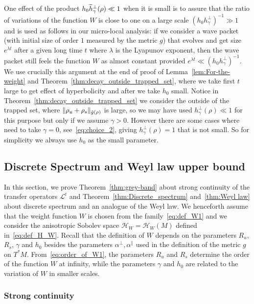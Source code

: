 \documentclass[AHL,Unicode,longabstracts,published]{cedram}
\newcommand{\clH}{\mathcal{H}}
\newcommand{\clL}{\mathcal{L}}
\let\oldtilde\tilde
\renewcommand*{\tilde}[1]{\mathchoice{\widetilde{#1}}{\widetilde{#1}}{\oldtilde{#1}}{\oldtilde{#1}}}
\newcommand{\clH}{\mathcal{H}}
\begin{document}
One effect of the product $h_{0}\tilde{h}_{\gamma}^{\perp}(\rho)\ll1$ when it is small is to assure that the ratio of variations of the function $W$ is close to one on a large scale $(h_{0}h_{\gamma}^{\perp})^{-1}\gg1$ and is used as follows in our micro-local analysis: if we consider a wave packet (with initial size of order $1$ measured by the metric $g$) that evolves and get size $e^{\lambda t}$ after a given long time $t$ where $\lambda$ is the Lyapunov exponent, then the wave packet still feels the function $W$ as almost constant provided $e^{\lambda t}\ll(h_{0}h_{\gamma}^{\perp})^{-1}$. We use crucially this argument at the end of proof of Lemma~\ref{lem:For-the-weight} and Theorem~\ref{thm:decay_outside_trapped_set}, where we take first $t$ large to get effect of hyperbolicity and after we take $h_{0}$ small. Notice in Theorem~\ref{thm:decay_outside_trapped_set} we consider the outside of the trapped set, where $\Vert \rho_{u}+\rho_{s}\Vert _{\tilde{g}(\rho)}$ is large, so we may have used $h_{\gamma}^{\perp}(\rho)\ll1$ for this purpose but only if we assume $\gamma>0$. However there are some cases where need to take $\gamma=0$, see~\eqref{eq:choice_2}, giving $h_{\gamma}^{\perp}(\rho)=1$ that is not small. So for simplicity we always use $h_{0}$ as the small parameter.

\subsection{\label{subsec:Discrete-Spectrum-and}
Discrete Spectrum and Weyl law upper bound}

In this section, we prove Theorem~\ref{thm:grey-band} about strong continuity of the transfer operators $\clL^{t}$ and Theorem~\ref{thm:Discrete_spectrum} and~\ref{thm:Weyl law} about discrete spectrum and an analogue of the Weyl law. We henceforth assume that the weight function $W$ is chosen from the family~\eqref{eq:def_W1} and we consider the anisotropic Sobolev space $\clH _{W}=\clH _{W}\left(M\right)$ defined in~\eqref{eq:def_H_W}. Recall that the definition of $W$ depends on the parameters $R_{u}$, $R_{s}$, $\gamma$ and $h_{0}$ besides the parameters $\alpha^{\perp},\alpha^{\parallel}$ used in the definition of the metric $g$ on $T^{*}M$. From~\eqref{eq:order_of_W1}, the parameters $R_{u}$ and $R_{s}$ determine the order of the function $W$ at infinity, while the parameters $\gamma$ and $h_{0}$ are related to the variation of $W$ in smaller scales.

\subsubsection{Strong continuity}
\end{document}
